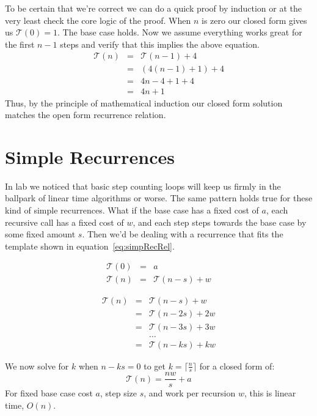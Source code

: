 \documentclass[nobib]{tufte-handout}
\begin{document}
To be certain that we're correct we can do a quick proof by induction or at the very least check the core logic of the proof.  When $n$ is zero our closed form gives us $\mathcal{T}(0) = 1$. The base case holds. Now we assume everything works great for the first $n-1$ steps and verify that this implies the above equation.
\begin{equation*}
  \begin{array}{rcl}
    \mathcal{T}(n) &=& \mathcal{T}(n-1) + 4 \\
    &=& (4(n-1) + 1)  + 4 \\
    &=& 4n - 4 + 1 + 4 \\
    &=& 4n + 1
  \end{array}
\end{equation*}
Thus, by the principle of mathematical induction our closed form solution matches the open form recurrence relation.

\section{Simple Recurrences}

In lab we noticed that basic step counting loops will keep us firmly in the ballpark of linear time algorithms or worse. The same pattern holds true for these kind of simple recurrences. What if the base case has a fixed cost of $a$, each recursive call has a fixed cost of $w$, and each step steps towards the base case by some fixed amount $s$. Then we'd be dealing with a recurrence that fits the template shown in equation~\ref{eq:simpRecRel}.

\begin{equation}
  \begin{array}{rcl}
    \mathcal{T}(0) &=& a \\
    \mathcal{T}(n) &=& \mathcal{T}(n-s) + w
  \end{array}
\label{eq:simpRecRel}
\end{equation}

\begin{equation}
  \begin{array}{rcl}
    \mathcal{T}(n) &=& \mathcal{T}(n-s) + w \\
    &=& \mathcal{T}(n-2s) + 2w \\
    &=& \mathcal{T}(n-3s) + 3w \\
    && \ldots \\
    &=& \mathcal{T}(n-ks) + kw
  \end{array}
\label{eq:simpRecRel}
\end{equation}

We now solve for $k$ when $n-ks=0$ to get $k = \lceil \frac{n}{s} \rceil$ for a closed form of:
\begin{equation}
    \mathcal{T}(n) = \frac{nw}{s} + a
\end{equation}
For fixed base case cost $a$, step size $s$, and work per recursion $w$, this is linear time, $O(n)$.
\end{document}
